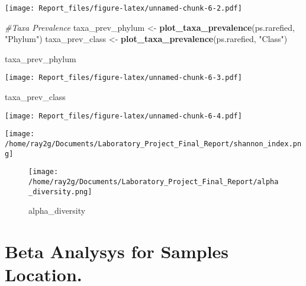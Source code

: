 \documentclass[]{article}
\newenvironment{Shaded}{\begin{snugshade}}{\end{snugshade}}
\newcommand{\CommentTok}[1]{\textcolor[rgb]{0.56,0.35,0.01}{\textit{#1}}}
\newcommand{\KeywordTok}[1]{\textcolor[rgb]{0.13,0.29,0.53}{\textbf{#1}}}
\newcommand{\NormalTok}[1]{#1}
\newcommand{\StringTok}[1]{\textcolor[rgb]{0.31,0.60,0.02}{#1}}
\begin{document}
\texttt{[image: Report\_files/figure-latex/unnamed-chunk-6-2.pdf]}

\begin{Shaded}
\begin{Highlighting}[]
\CommentTok{#Taxa Prevalence}
\NormalTok{taxa_prev_phylum <-}\StringTok{ }\KeywordTok{plot_taxa_prevalence}\NormalTok{(ps.rarefied, }\StringTok{"Phylum"}\NormalTok{)}
\NormalTok{taxa_prev_class <-}\StringTok{ }\KeywordTok{plot_taxa_prevalence}\NormalTok{(ps.rarefied, }\StringTok{"Class"}\NormalTok{)}

\NormalTok{taxa_prev_phylum}
\end{Highlighting}
\end{Shaded}

\texttt{[image: Report\_files/figure-latex/unnamed-chunk-6-3.pdf]}

\begin{Shaded}
\begin{Highlighting}[]
\NormalTok{taxa_prev_class }
\end{Highlighting}
\end{Shaded}

\texttt{[image: Report\_files/figure-latex/unnamed-chunk-6-4.pdf]}

\texttt{[image: /home/ray2g/Documents/Laboratory\_Project\_Final\_Report/shannon\_index.png]}

\begin{figure}
\centering
\texttt{[image: /home/ray2g/Documents/Laboratory\_Project\_Final\_Report/alpha\_diversity.png]}
\caption{alpha\_diversity}
\end{figure}

\hypertarget{beta-analysys-for-samples-location.}{%
\section{Beta Analysys for Samples
Location.}\label{beta-analysys-for-samples-location.}}
\end{document}
